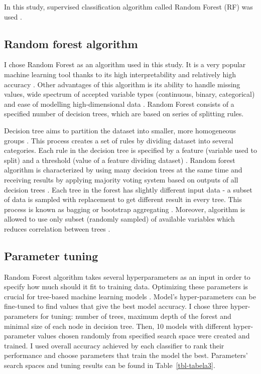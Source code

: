 \documentclass{amuthesis}
\begin{document}
In this study, supervised classification algorithm called Random Forest
(RF) was used \autocite{breiman_random_2001}.

\hypertarget{sec-rf}{%
\subsection{Random forest algorithm}\label{sec-rf}}

I chose Random Forest as an algorithm used in this study. It is a very
popular machine learning tool thanks to its high interpretability and
relatively high accuracy \autocite{qi_random_2012}. Other advantages of
this algorithm is its ability to handle missing values, wide spectrum of
accepted variable types (continuous, binary, categorical) and ease of
modelling high-dimensional data \autocite{qi_random_2012}. Random Forest
consists of a specified number of decision trees, which are based on
series of splitting rules.

Decision tree aims to partition the dataset into smaller, more
homogeneous groups \autocite{kuhn_applied_2013}. This process creates a
set of rules by dividing dataset into several categories. Each rule in
the decision tree is specified by a feature (variable used to split) and
a threshold (value of a feature dividing dataset)
\autocite{sekulic_random_2020}. Random forest algorithm is characterized
by using many decision trees at the same time and receiving results by
applying majority voting system based on outputs of all decision trees
\autocite{kuhn_applied_2013}. Each tree in the forest has slightly
different input data - a subset of data is sampled with replacement to
get different result in every tree. This process is known as bagging or
bootstrap aggregating \autocite{schonlau_random_2020}. Moreover,
algorithm is allowed to use only subset (randomly sampled) of available
variables which reduces correlation between trees
\autocite{sohil_introduction_2022}.

\hypertarget{sec-tuning}{%
\subsection{Parameter tuning}\label{sec-tuning}}

Random Forest algorithm takes several hyperparameters as an input in
order to specify how much should it fit to training data. Optimizing
these parameters is crucial for tree-based machine learning models
\autocite{yang_hyperparameter_2020}. Model's hyper-parameters can be
fine-tuned to find values that give the best model accuracy. I chose
three hyper-parameters for tuning: number of trees, maximum depth of the
forest and minimal size of each node in decision tree. Then, 10 models
with different hyper-parameter values chosen randomly from specified
search space were created and trained. I used overall accuracy achieved
by each classifier to rank their performance and choose parameters that
train the model the best. Parameters' search spaces and tuning results
can be found in Table~\ref{tbl-tabela3}.
\end{document}
